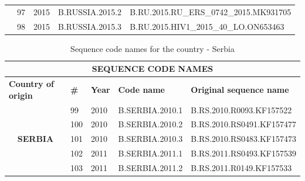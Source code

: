 \begin{table}[htbp]
\begin{tabular}{|cllll|}
\multicolumn{1}{|c|}{}                                  & \multicolumn{1}{l|}{97}          & \multicolumn{1}{l|}{2015}          & \multicolumn{1}{l|}{B.RUSSIA.2015.2}    & B.RU.2015.RU\_ERS\_0742\_2015.MK931705   \\ \cline{2-5} 
\multicolumn{1}{|c|}{}                                  & \multicolumn{1}{l|}{98}          & \multicolumn{1}{l|}{2015}          & \multicolumn{1}{l|}{B.RUSSIA.2015.3}    & B.RU.2015.HIV1\_2015\_40\_LO.ON653463    \\ \hline
\end{tabular}
\end{table}


\begin{table}[htbp]
    \caption{Sequence code names for the country - Serbia}
    \centering
\begin{tabular}{|cllll|}
\hline
\multicolumn{5}{|c|}{\textbf{SEQUENCE   CODE NAMES}}                                                                                                                                                        \\ \hline
\multicolumn{1}{|l|}{\textbf{Country   of origin}}      & \multicolumn{1}{l|}{\textbf{\#}} & \multicolumn{1}{r|}{\textbf{Year}} & \multicolumn{1}{l|}{\textbf{Code name}} & \textbf{Original sequence name} \\ \hline
\multicolumn{1}{|c|}{\multirow{16}{*}{\textbf{SERBIA}}} & \multicolumn{1}{l|}{99}          & \multicolumn{1}{l|}{2010}          & \multicolumn{1}{l|}{B.SERBIA.2010.1}    & B.RS.2010.R0093.KF157522        \\ \cline{2-5} 
\multicolumn{1}{|c|}{}                                  & \multicolumn{1}{l|}{100}         & \multicolumn{1}{l|}{2010}          & \multicolumn{1}{l|}{B.SERBIA.2010.2}    & B.RS.2010.RS0491.KF157477       \\ \cline{2-5} 
\multicolumn{1}{|c|}{}                                  & \multicolumn{1}{l|}{101}         & \multicolumn{1}{l|}{2010}          & \multicolumn{1}{l|}{B.SERBIA.2010.3}    & B.RS.2010.RS0483.KF157473       \\ \cline{2-5} 
\multicolumn{1}{|c|}{}                                  & \multicolumn{1}{l|}{102}         & \multicolumn{1}{l|}{2011}          & \multicolumn{1}{l|}{B.SERBIA.2011.1}    & B.RS.2011.RS0493.KF157539       \\ \cline{2-5} 
\multicolumn{1}{|c|}{}                                  & \multicolumn{1}{l|}{103}         & \multicolumn{1}{l|}{2011}          & \multicolumn{1}{l|}{B.SERBIA.2011.2}    & B.RS.2011.R0149.KF157533        \\ \cline{2-5} 

\end{tabular}
\end{table}
